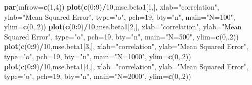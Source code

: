 \documentclass[]{article}
\newenvironment{Shaded}{\begin{snugshade}}{\end{snugshade}}
\newcommand{\DataTypeTok}[1]{\textcolor[rgb]{0.13,0.29,0.53}{#1}}
\newcommand{\DecValTok}[1]{\textcolor[rgb]{0.00,0.00,0.81}{#1}}
\newcommand{\KeywordTok}[1]{\textcolor[rgb]{0.13,0.29,0.53}{\textbf{#1}}}
\newcommand{\NormalTok}[1]{#1}
\newcommand{\OperatorTok}[1]{\textcolor[rgb]{0.81,0.36,0.00}{\textbf{#1}}}
\newcommand{\StringTok}[1]{\textcolor[rgb]{0.31,0.60,0.02}{#1}}
\begin{document}
\begin{Shaded}
\begin{Highlighting}[]
\KeywordTok{par}\NormalTok{(}\DataTypeTok{mfrow=}\KeywordTok{c}\NormalTok{(}\DecValTok{1}\NormalTok{,}\DecValTok{4}\NormalTok{))}
\KeywordTok{plot}\NormalTok{(}\KeywordTok{c}\NormalTok{(}\DecValTok{0}\OperatorTok{:}\DecValTok{9}\NormalTok{)}\OperatorTok{/}\DecValTok{10}\NormalTok{,mse.beta1[}\DecValTok{1}\NormalTok{,], }\DataTypeTok{xlab=}\StringTok{"correlation"}\NormalTok{, }\DataTypeTok{ylab=}\StringTok{"Mean Squared Error"}\NormalTok{, }\DataTypeTok{type=}\StringTok{"o"}\NormalTok{, }\DataTypeTok{pch=}\DecValTok{19}\NormalTok{, }\DataTypeTok{bty=}\StringTok{"n"}\NormalTok{, }\DataTypeTok{main=}\StringTok{"N=100"}\NormalTok{, }\DataTypeTok{ylim=}\KeywordTok{c}\NormalTok{(}\DecValTok{0}\NormalTok{,.}\DecValTok{2}\NormalTok{))}
\KeywordTok{plot}\NormalTok{(}\KeywordTok{c}\NormalTok{(}\DecValTok{0}\OperatorTok{:}\DecValTok{9}\NormalTok{)}\OperatorTok{/}\DecValTok{10}\NormalTok{,mse.beta1[}\DecValTok{2}\NormalTok{,], }\DataTypeTok{xlab=}\StringTok{"correlation"}\NormalTok{, }\DataTypeTok{ylab=}\StringTok{"Mean Squared Error"}\NormalTok{, }\DataTypeTok{type=}\StringTok{"o"}\NormalTok{, }\DataTypeTok{pch=}\DecValTok{19}\NormalTok{, }\DataTypeTok{bty=}\StringTok{"n"}\NormalTok{, }\DataTypeTok{main=}\StringTok{"N=500"}\NormalTok{, }\DataTypeTok{ylim=}\KeywordTok{c}\NormalTok{(}\DecValTok{0}\NormalTok{,.}\DecValTok{2}\NormalTok{))}
\KeywordTok{plot}\NormalTok{(}\KeywordTok{c}\NormalTok{(}\DecValTok{0}\OperatorTok{:}\DecValTok{9}\NormalTok{)}\OperatorTok{/}\DecValTok{10}\NormalTok{,mse.beta1[}\DecValTok{3}\NormalTok{,], }\DataTypeTok{xlab=}\StringTok{"correlation"}\NormalTok{, }\DataTypeTok{ylab=}\StringTok{"Mean Squared Error"}\NormalTok{, }\DataTypeTok{type=}\StringTok{"o"}\NormalTok{, }\DataTypeTok{pch=}\DecValTok{19}\NormalTok{, }\DataTypeTok{bty=}\StringTok{"n"}\NormalTok{, }\DataTypeTok{main=}\StringTok{"N=1000"}\NormalTok{, }\DataTypeTok{ylim=}\KeywordTok{c}\NormalTok{(}\DecValTok{0}\NormalTok{,.}\DecValTok{2}\NormalTok{))}
\KeywordTok{plot}\NormalTok{(}\KeywordTok{c}\NormalTok{(}\DecValTok{0}\OperatorTok{:}\DecValTok{9}\NormalTok{)}\OperatorTok{/}\DecValTok{10}\NormalTok{,mse.beta1[}\DecValTok{4}\NormalTok{,], }\DataTypeTok{xlab=}\StringTok{"correlation"}\NormalTok{, }\DataTypeTok{ylab=}\StringTok{"Mean Squared Error"}\NormalTok{, }\DataTypeTok{type=}\StringTok{"o"}\NormalTok{, }\DataTypeTok{pch=}\DecValTok{19}\NormalTok{, }\DataTypeTok{bty=}\StringTok{"n"}\NormalTok{, }\DataTypeTok{main=}\StringTok{"N=2000"}\NormalTok{, }\DataTypeTok{ylim=}\KeywordTok{c}\NormalTok{(}\DecValTok{0}\NormalTok{,.}\DecValTok{2}\NormalTok{))}
\end{Highlighting}
\end{Shaded}
\end{document}
